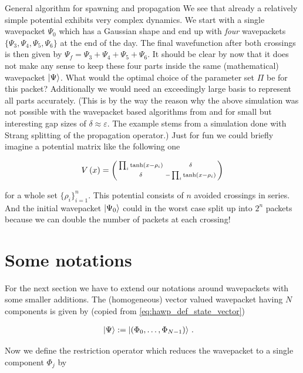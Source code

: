 \begin{chapter}{General algorithm for spawning and propagation}
We see that already a relatively simple potential exhibits very complex dynamics.
We start with a single wavepacket $\Psi_0$ which has a Gaussian shape and end up
with \emph{four} wavepackets $\{\Psi_3, \Psi_4, \Psi_5, \Psi_6\}$ at the end of
the day. The final wavefunction after both crossings is then given by $\Psi_f = \Psi_3 + \Psi_4 + \Psi_5 + \Psi_6$.
It should be clear by now that it does not make any sense to keep these four parts
inside the same (mathematical) wavepacket $\Ket{\Psi}$. What would the optimal
choice of the parameter set $\Pi$ be for this packet? Additionally we would need
an exceedingly large basis to represent all parts accurately. (This is by the way
the reason why the above simulation was not possible with the wavepacket based algorithms
from \cite{FGL_semiclassical_dynamics} and \cite{BGH_nonadibatic_algorithms} for
small but interesting gap sizes of $\delta \approx \varepsilon$. The example stems
from a simulation done with Strang splitting of the propagation operator.) Just
for fun we could briefly imagine a potential matrix like the following one

\begin{equation*}
  V\left( x \right) =
  \left(\begin{smallmatrix}
  \prod_i\tanh\left( x-\rho_i \right) & \delta\\
  \delta                     & - \prod_i\tanh\left( x-\rho_i \right)
  \end{smallmatrix}\right)
\end{equation*}

for a whole set $\{\rho_i\}_{i=1}^n$. This potential consists of $n$ avoided
crossings in series. And the initial wavepacket $\Ket{\Psi_0}$ could in the
worst case split up into $2^n$ packets because we can double the number of packets
at each crossing!


\section{Some notations}

For the next section we have to extend our notations around wavepackets with
some smaller additions. The (homogeneous) vector valued wavepacket having $N$
components is given by (copied from \eqref{eq:hawp_def_state_vector})

\begin{align}
  \Ket{\Psi} & := \Ket{\left(\Phi_0, \hdots, \Phi_{N-1}\right)} \,.
\end{align}

Now we define the restriction operator which reduces the wavepacket to a single
component $\Phi_j$ by


\end{chapter}

